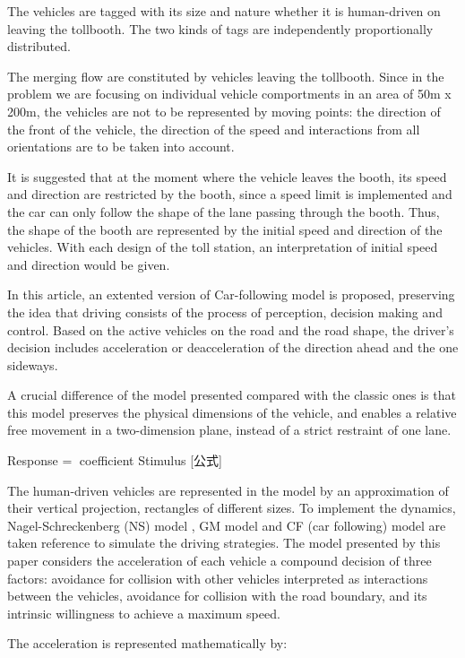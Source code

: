 \documentclass{mcmthesis}
\begin{document}
The vehicles are tagged with its size and nature whether it is human-driven on leaving the tollbooth. The two kinds of tags are independently proportionally distributed.

The merging flow are constituted by vehicles leaving the tollbooth. Since in the problem we are focusing on individual vehicle comportments in an area of 50m x 200m, the vehicles are not to be represented by moving points: the direction of the front of the vehicle, the direction of the speed and interactions from all orientations are to be taken into account.

It is suggested that at the moment where the vehicle leaves the booth, its speed and direction are restricted by the booth, since a speed limit is implemented and the car can only follow the shape of the lane passing through the booth. Thus, the shape of the booth are represented by the initial speed and direction of the vehicles. With each design of the toll station, an interpretation of initial speed and direction would be given.

In this article, an extented version of Car-following model is proposed, preserving the idea that driving consists of the process of perception, decision making and control. Based on the active vehicles on the road and the road shape, the driver's decision includes acceleration or deacceleration of the direction ahead and the one sideways.

A crucial difference of the model presented compared with the classic ones is that this model preserves the physical dimensions of the vehicle, and enables a relative free movement in a two-dimension plane, instead of a strict restraint of one lane. 

Response = coefficient Stimulus [公式]

The human-driven vehicles are represented in the model by an approximation of their vertical projection, rectangles of different sizes. To implement the dynamics, Nagel-Schreckenberg (NS) model \cite{acelluar}, GM model and CF (car following) model are taken reference to simulate the driving strategies. The model presented by this paper considers the acceleration of each vehicle a compound decision of three factors: avoidance for collision with other vehicles interpreted as interactions between the vehicles, avoidance for collision with the road boundary, and its intrinsic willingness to achieve a maximum speed. 

The acceleration is represented mathematically by: 
\end{document}
